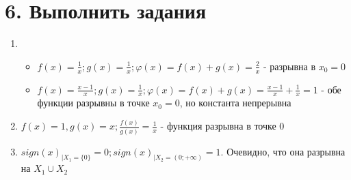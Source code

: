 \documentclass{article}
\begin{document}
\section*{6. Выполнить задания}
\begin{enumerate}
    \item
    \begin{itemize}
        \item $f(x) = \frac{1}{x}; g(x) = \frac{1}{x}; \varphi(x) = f(x) + g(x) = \frac{2}{x}$ - разрывна в $x_0 = 0$
        \item $f(x) = \frac{x - 1}{x}; g(x) = \frac{1}{x}; \varphi(x) = f(x) + g(x) = \frac{x - 1}{x} + \frac{1}{x} = 1$ - обе функции разрывны в точке $x_0 = 0$, но константа непрерывна
    \end{itemize}
    \item $f(x) = 1, g(x) = x; \frac{f(x)}{g(x)} = \frac{1}{x}$ - функция разрывна в точке 0
    \item $sign(x)_{\big|X_1 = \{0\}} = 0; sign(x)_{\big|X_2 = (0; +\infty)} = 1$. Очевидно, что она разрывна на $X_1 \cup X_2$
    
\end{enumerate}
\end{document}
